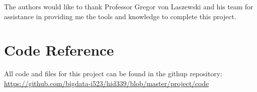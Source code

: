\documentclass[sigconf]{acmart}
\begin{document}
\begin{acks}
The authors would like to thank Professor Gregor von Laszewski and his team for assistance in providing me the tools and knowledge to complete this project.
\end{acks}


 


\newpage
\appendix
\section{Code Reference}
All code and files for this project can be found in the githup repository:
\url{https://github.com/bigdata-i523/hid339/blob/master/project/code}
\end{document}
